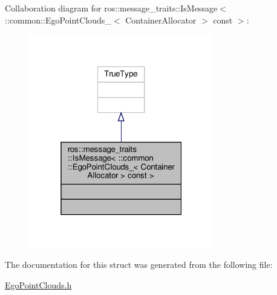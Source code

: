 Collaboration diagram for ros\+:\+:message\+\_\+traits\+:\+:Is\+Message$<$ \+:\+:common\+:\+:Ego\+Point\+Clouds\+\_\+$<$ Container\+Allocator $>$ const $>$\+:\nopagebreak
\begin{figure}[H]
\begin{center}
\leavevmode
\includegraphics[width=229pt]{d7/d28/structros_1_1message__traits_1_1IsMessage_3_01_1_1common_1_1EgoPointClouds___3_01ContainerAllocaf816e8fbb6520cd5e8601e311991e822}
\end{center}
\end{figure}


The documentation for this struct was generated from the following file\+:\begin{DoxyCompactItemize}
\item 
\hyperlink{EgoPointClouds_8h}{Ego\+Point\+Clouds.\+h}\end{DoxyCompactItemize}
